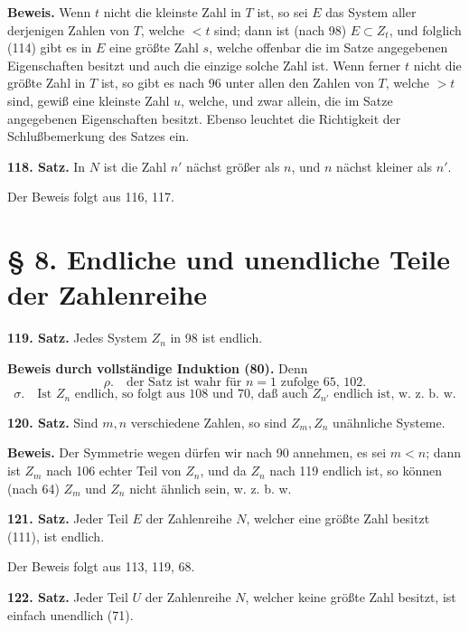 \documentclass[11pt]{article}
\newcommand{\partof}{\mathrel{\subset}}
\begin{document}
\textbf{Beweis.} Wenn $t$ nicht die kleinste Zahl in $T$ ist, so sei $E$ das System aller derjenigen Zahlen von $T$, welche $<t$ sind; dann ist (nach 98) $E\partof Z_t$, und folglich (114) gibt es in $E$ eine größte Zahl $s$, welche offenbar die im Satze angegebenen Eigenschaften besitzt und auch die einzige solche Zahl ist. Wenn ferner $t$ nicht die größte Zahl in $T$ ist, so gibt es nach 96 unter allen den Zahlen von $T$, welche $>t$ sind, gewiß eine kleinste Zahl $u$, welche, und zwar allein, die im Satze angegebenen Eigenschaften besitzt. Ebenso leuchtet die Richtigkeit der Schlußbemerkung des Satzes ein.

\noindent\textbf{118. Satz.} In $N$ ist die Zahl $n'$ nächst größer als $n$, und $n$ nächst kleiner als $n'$.

Der Beweis folgt aus 116, 117.

\section*{\S{} 8. Endliche und unendliche Teile der Zahlenreihe}

\noindent\textbf{119. Satz.} Jedes System $Z_n$ in 98 ist endlich.

\noindent\textbf{Beweis durch vollständige Induktion (80).} Denn
\[
\rho.\quad \text{der Satz ist wahr für }n=1\text{ zufolge 65, 102.}
\]
\[
\sigma.\quad \text{Ist }Z_n\text{ endlich, so folgt aus 108 und 70, daß auch }Z_{n'}\text{ endlich ist, w. z. b. w.}
\]

\noindent\textbf{120. Satz.} Sind $m,n$ verschiedene Zahlen, so sind $Z_m,Z_n$ unähnliche Systeme.

\noindent\textbf{Beweis.} Der Symmetrie wegen dürfen wir nach 90 annehmen, es sei $m<n$; dann ist $Z_m$ nach 106 echter Teil von $Z_n$, und da $Z_n$ nach 119 endlich ist, so können (nach 64) $Z_m$ und $Z_n$ nicht ähnlich sein, w. z. b. w.

\noindent\textbf{121. Satz.} Jeder Teil $E$ der Zahlenreihe $N$, welcher eine größte Zahl besitzt (111), ist endlich.

Der Beweis folgt aus 113, 119, 68.

\noindent\textbf{122. Satz.} Jeder Teil $U$ der Zahlenreihe $N$, welcher keine größte Zahl besitzt, ist einfach unendlich (71).
\end{document}
